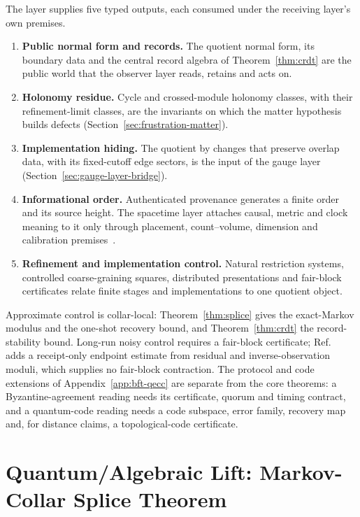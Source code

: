 \documentclass[11pt]{article}
\theoremstyle{remark}
\theoremstyle{plain}
\begin{document}
The layer supplies five typed outputs, each consumed under the receiving
layer's own premises.
\begin{enumerate}[leftmargin=2em]
\item \textbf{Public normal form and records.} The quotient normal form,
its boundary data and the central record algebra of Theorem~\ref{thm:crdt}
are the public world that the observer layer reads, retains and acts on.
\item \textbf{Holonomy residue.} Cycle and crossed-module holonomy classes,
with their refinement-limit classes, are the invariants on which the matter
hypothesis builds defects (Section~\ref{sec:frustration-matter}).
\item \textbf{Implementation hiding.} The quotient by changes that preserve
overlap data, with its fixed-cutoff edge sectors, is the input of the gauge
layer (Section~\ref{sec:gauge-layer-bridge}).
\item \textbf{Informational order.} Authenticated provenance generates a
finite order and its source height. The spacetime layer attaches causal,
metric and clock meaning to it only through placement, count--volume,
dimension and calibration premises~\cite{ophEinstein}.
\item \textbf{Refinement and implementation control.} Natural restriction
systems, controlled coarse-graining squares, distributed presentations and
fair-block certificates relate finite stages and implementations to one
quotient object.
\end{enumerate}

Approximate control is collar-local: Theorem~\ref{thm:splice} gives the
exact-Markov modulus and the one-shot recovery bound, and
Theorem~\ref{thm:crdt} the record-stability bound. Long-run noisy control
requires a fair-block certificate; Ref.~\cite{observableNormalForms} adds a
receipt-only endpoint estimate from residual and inverse-observation moduli,
which supplies no fair-block contraction. The protocol and code extensions
of Appendix~\ref{app:bft-qecc} are separate from the core theorems: a
Byzantine-agreement reading needs its certificate, quorum and timing
contract, and a quantum-code reading needs a code subspace, error family,
recovery map and, for distance claims, a topological-code certificate.


\appendix
\section{Quantum/Algebraic Lift: Markov-Collar Splice Theorem}\label{app:splice}
\end{document}
